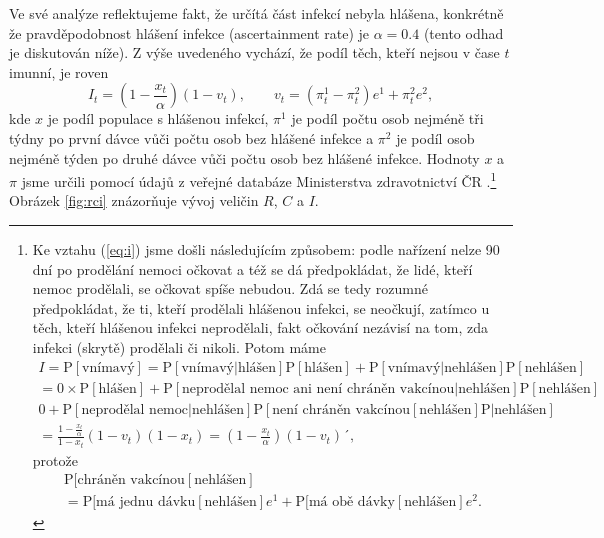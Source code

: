 Ve své analýze reflektujeme fakt, že určítá část infekcí nebyla
hlášena, konkrétně že pravděpodobnost hlášení infekce (ascertainment
rate) je $\alpha=0.4$ (tento odhad je diskutován níže). Z výše uvedeného vychází,
že podíl těch, kteří nejsou v čase $t$ imunní, je roven
\begin{equation}
I_{t}=\left(1-\frac{x_{t}}{\alpha}\right)\left(1-v_{t}\right),\qquad v_{t}=(\pi_{t}^{1}-\pi_{t}^{2})e^{1}+\pi_{t}^{2}e^{2},\label{eq:i}
\end{equation}
kde $x$ je podíl populace s hlášenou infekcí, $\pi^{1}$ je podíl počtu osob nejméně tři týdny po první dávce vůči počtu osob bez hlášené infekce a $\pi^{2}$ je podíl osob
nejméně týden po druhé dávce vůči počtu osob bez hlášené infekce. Hodnoty $x$ a $\pi$ jsme určili pomocí údajů z veřejné databáze Ministerstva
zdravotnictví ČR \cite{mzcrdata}.\footnote{Ke vztahu (\ref{eq:i}) jsme došli následujícím způsobem: podle nařízení \cite{covidportalspec} nelze 90 dní po prodělání nemoci očkovat a též se dá předpokládat, že lidé, kteří nemoc prodělali, se očkovat spíše nebudou. Zdá se tedy rozumné předpokládat, že ti, kteří prodělali hlášenou infekci, se neočkují, zatímco u těch, kteří hlášenou infekci neprodělali, fakt očkování nezávisí na tom, zda infekci (skrytě) prodělali či nikoli. Potom máme 
\begin{multline*}
I = \mathrm{P}[\text{vnímavý}]= \mathrm{P}[\text{vnímavý}|\text{hlášen}]\mathrm{P}[\text{hlášen}]
+\mathrm{P}[\text{vnímavý}|\text{nehlášen}]\mathrm{P}[\text{nehlášen}]
\\
= 0 \times \mathrm{P}[\text{hlášen}] 
+ \mathrm{P}[\text{neprodělal nemoc ani není chráněn vakcínou}|\text{nehlášen}]\mathrm{P}[\text{nehlášen}]
\\
0+\mathrm{P}[\text{neprodělal nemoc}|\text{nehlášen}]\mathrm{P}[\text{není chráněn vakcínou}[\text{nehlášen}]\mathrm{P}|\text{nehlášen}]
\\
= \frac{1-\frac{x_{t}}{\alpha}}{1-x_t}\left(1-v_{t}\right)(1-x_t)=\left(1-\frac{x_{t}}{\alpha}\right)\left(1-v_{t}\right)´,
\end{multline*}
protože
\begin{multline*}
\mathrm{P}[\text{chráněn vakcínou}[\text{nehlášen}]\\=\mathrm{P}[\text{má jednu dávku}[\text{nehlášen}]e^1+\mathrm{P}[\text{má obě dávky}[\text{nehlášen}] e^2.
\end{multline*}
}
Obrázek \ref{fig:rci} znázorňuje vývoj veličin $R$, $C$ a $I$.

